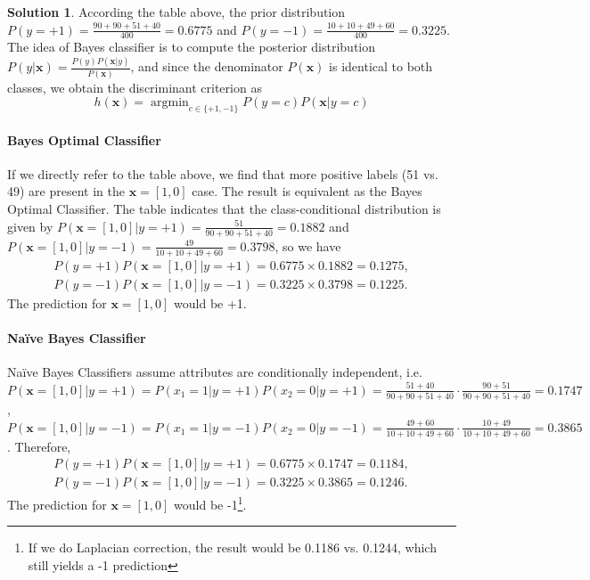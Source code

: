 \documentclass[a4paper,UTF8]{article}
\numberwithin{equation}{section}
\theoremstyle{definition}
\newtheorem*{solution}{Solution}
\begin{document}
\begin{solution}
According the table above, the prior distribution $P(y=+1)=\frac{90+90+51+40}{400}=0.6775$ and $P(y=-1)=\frac{10+10+49+60}{400}=0.3225$. The idea of Bayes classifier is to compute the posterior distribution $P(y|\bm{x})=\frac{P(y)P(\bm{x}|y)}{P(\bm{x})}$, and since the denominator $P(\bm{x})$ is identical to both classes, we obtain the discriminant criterion as
\begin{equation}
h(\bm{x})=\mathop{\arg\min}_{c\in\{+1,-1\}}P(y=c)P(\bm{x}|y=c)
\end{equation}

\paragraph{Bayes Optimal Classifier} If we directly refer to the table above, we find that more positive labels (51 vs. 49) are present in the $\bm{x}=[1,0]$ case. The result is equivalent as the Bayes Optimal Classifier.
The table indicates that the class-conditional distribution is given by $P(\bm{x}=[1,0]|y=+1)=\frac{51}{90+90+51+40}=0.1882$ and $P(\bm{x}=[1,0]|y=-1)=\frac{49}{10+10+49+60}=0.3798$, so we have
\begin{eqnarray}
P(y=+1)P(\bm{x}=[1,0]|y=+1)=0.6775\times 0.1882=0.1275,\\
P(y=-1)P(\bm{x}=[1,0]|y=-1)=0.3225\times 0.3798=0.1225.
\end{eqnarray}
The prediction for $\bm{x}=[1,0]$ would be +1.

\paragraph{Naïve Bayes Classifier} Naïve Bayes Classifiers assume attributes are conditionally independent, i.e. $P(\bm{x}=[1,0]|y=+1)=P(x_1=1|y=+1)P(x_2=0|y=+1)=\frac{51+40}{90+90+51+40}\cdot\frac{90+51}{90+90+51+40}=0.1747$, $P(\bm{x}=[1,0]|y=-1)=P(x_1=1|y=-1)P(x_2=0|y=-1)=\frac{49+60}{10+10+49+60}\cdot\frac{10+49}{10+10+49+60}=0.3865$. Therefore, 
\begin{eqnarray}
P(y=+1)P(\bm{x}=[1,0]|y=+1)=0.6775\times 0.1747=0.1184,\\
P(y=-1)P(\bm{x}=[1,0]|y=-1)=0.3225\times 0.3865=0.1246.
\end{eqnarray}
The prediction for $\bm{x}=[1,0]$ would be -1\footnote{If we do Laplacian correction, the result would be 0.1186 vs. 0.1244, which still yields a -1 prediction}.

\end{solution}
\end{document}
